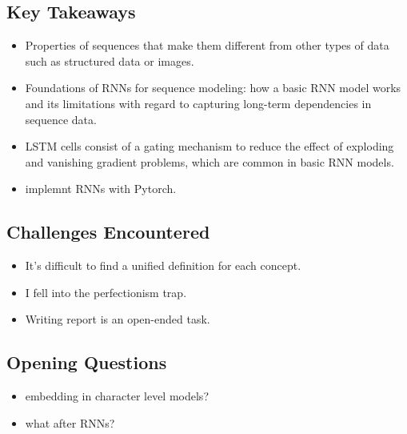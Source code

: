 \subsection{Key Takeaways}
\begin{itemize}
    \item Properties of sequences that make them different from other types of data such as structured data or images.
    \item Foundations of RNNs for sequence modeling: how a basic RNN model works and its limitations with regard to capturing long-term dependencies in sequence data.
    \item LSTM cells consist of a gating mechanism to reduce the effect of exploding and vanishing gradient problems, which are common in basic RNN models.
    \item implemnt RNNs with Pytorch.
\end{itemize}

\subsection{Challenges Encountered}
\begin{itemize}
    \item It's difficult to find a unified definition for each concept.
    \item I fell into the perfectionism trap.
    \item Writing report is an open-ended task.
\end{itemize}

\subsection{Opening Questions}
\begin{itemize}
    \item embedding in character level models?
    \item what after RNNs?
\end{itemize}
